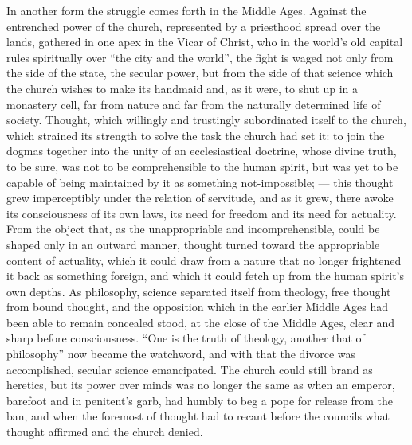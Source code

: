 \documentclass[12pt,a4paper,openany]{book}
\newcommand{\opage}[1]{\marginnote{\footnotesize\textit{[#1]}}}
\begin{document}
In another form the struggle comes forth in the Middle Ages.
Against the entrenched power of the church, represented by a
priesthood spread over the lands, gathered in one apex
in the Vicar of Christ, who in the world's old capital rules
spiritually over ``the city and the world'', the fight is waged not only
from the side of the state, the secular power, but from the side of that
science which the church wishes to make its handmaid
and, as it were, to shut up in a monastery cell, far from nature and
far from the naturally determined life of society. Thought, which willingly
and trustingly subordinated itself to the church, which
strained its strength to solve the task the church had
set it: to join the dogmas together into the unity of an ecclesiastical doctrine,
whose divine truth, to be sure, was not to be
comprehensible to the human spirit, but was yet to be capable of being
maintained by it as something not-impossible; --- this thought
grew imperceptibly under the relation of servitude, and as it grew,
there awoke its consciousness of its own laws, its need
for freedom and its need for actuality. From the object
that, as the unappropriable and incomprehensible, could be shaped only in an outward
manner, thought turned toward the
appropriable content of actuality, which it could draw from a
nature that no longer frightened it back as something foreign,
and which it could fetch up from the human spirit's own
depths. As philosophy, science separated itself from theology,
free thought from bound thought, and the opposition which in the
\opage{292}earlier Middle Ages had been able to remain concealed stood, at the close of the Middle Ages,
clear and sharp before consciousness. ``One is
the truth of theology, another that of philosophy'' now became the watchword, and
with that the divorce was accomplished, secular science
emancipated. The church could still brand as heretics, but its
power over minds was no longer the same as when
an emperor, barefoot and in penitent's garb, had humbly to beg a
pope for release from the ban, and when the foremost of thought
had to recant before the councils what thought affirmed
and the church denied.
\end{document}
